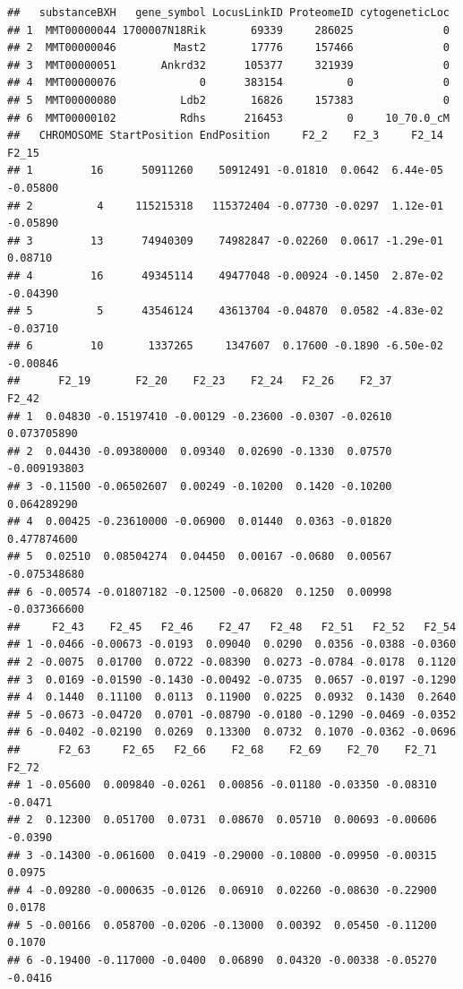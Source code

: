 \documentclass[]{article}
\begin{document}
\begin{verbatim}
##   substanceBXH   gene_symbol LocusLinkID ProteomeID cytogeneticLoc
## 1  MMT00000044 1700007N18Rik       69339     286025              0
## 2  MMT00000046         Mast2       17776     157466              0
## 3  MMT00000051       Ankrd32      105377     321939              0
## 4  MMT00000076             0      383154          0              0
## 5  MMT00000080          Ldb2       16826     157383              0
## 6  MMT00000102          Rdhs      216453          0     10_70.0_cM
##   CHROMOSOME StartPosition EndPosition     F2_2    F2_3     F2_14    F2_15
## 1         16      50911260    50912491 -0.01810  0.0642  6.44e-05 -0.05800
## 2          4     115215318   115372404 -0.07730 -0.0297  1.12e-01 -0.05890
## 3         13      74940309    74982847 -0.02260  0.0617 -1.29e-01  0.08710
## 4         16      49345114    49477048 -0.00924 -0.1450  2.87e-02 -0.04390
## 5          5      43546124    43613704 -0.04870  0.0582 -4.83e-02 -0.03710
## 6         10       1337265     1347607  0.17600 -0.1890 -6.50e-02 -0.00846
##      F2_19       F2_20    F2_23    F2_24   F2_26    F2_37        F2_42
## 1  0.04830 -0.15197410 -0.00129 -0.23600 -0.0307 -0.02610  0.073705890
## 2  0.04430 -0.09380000  0.09340  0.02690 -0.1330  0.07570 -0.009193803
## 3 -0.11500 -0.06502607  0.00249 -0.10200  0.1420 -0.10200  0.064289290
## 4  0.00425 -0.23610000 -0.06900  0.01440  0.0363 -0.01820  0.477874600
## 5  0.02510  0.08504274  0.04450  0.00167 -0.0680  0.00567 -0.075348680
## 6 -0.00574 -0.01807182 -0.12500 -0.06820  0.1250  0.00998 -0.037366600
##     F2_43    F2_45   F2_46    F2_47   F2_48   F2_51   F2_52   F2_54
## 1 -0.0466 -0.00673 -0.0193  0.09040  0.0290  0.0356 -0.0388 -0.0360
## 2 -0.0075  0.01700  0.0722 -0.08390  0.0273 -0.0784 -0.0178  0.1120
## 3  0.0169 -0.01590 -0.1430 -0.00492 -0.0735  0.0657 -0.0197 -0.1290
## 4  0.1440  0.11100  0.0113  0.11900  0.0225  0.0932  0.1430  0.2640
## 5 -0.0673 -0.04720  0.0701 -0.08790 -0.0180 -0.1290 -0.0469 -0.0352
## 6 -0.0402 -0.02190  0.0269  0.13300  0.0732  0.1070 -0.0362 -0.0696
##      F2_63     F2_65   F2_66    F2_68    F2_69    F2_70    F2_71   F2_72
## 1 -0.05600  0.009840 -0.0261  0.00856 -0.01180 -0.03350 -0.08310 -0.0471
## 2  0.12300  0.051700  0.0731  0.08670  0.05710  0.00693 -0.00606 -0.0390
## 3 -0.14300 -0.061600  0.0419 -0.29000 -0.10800 -0.09950 -0.00315  0.0975
## 4 -0.09280 -0.000635 -0.0126  0.06910  0.02260 -0.08630 -0.22900  0.0178
## 5 -0.00166  0.058700 -0.0206 -0.13000  0.00392  0.05450 -0.11200  0.1070
## 6 -0.19400 -0.117000 -0.0400  0.06890  0.04320 -0.00338 -0.05270 -0.0416

\end{verbatim}
\end{document}
